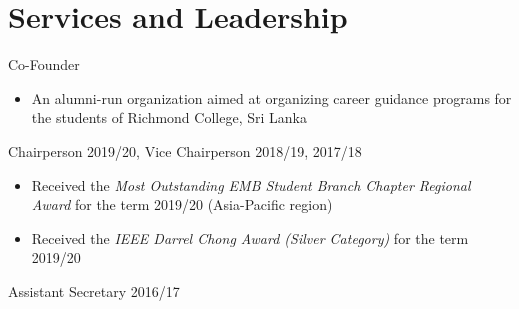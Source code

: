 \documentclass[10pt,a4paper,sans]{moderncv} %
\begin{document}


\section{Services and Leadership}
{Co-Founder}{}{}{
  \begin{itemize}
    \item An alumni-run organization aimed at organizing career guidance programs for the students of Richmond College, Sri Lanka
  \end{itemize}
}

{Chairperson 2019/20, Vice Chairperson 2018/19, 2017/18}{}{}{
  \begin{itemize}
    \item Received the \textit{Most Outstanding EMB Student Branch Chapter Regional Award} for the term 2019/20 (Asia-Pacific region)
    \item Received the \textit{IEEE Darrel Chong Award (Silver Category)} for the term 2019/20
  \end{itemize}
}

{Assistant Secretary 2016/17}{}{}{}



\end{document}
